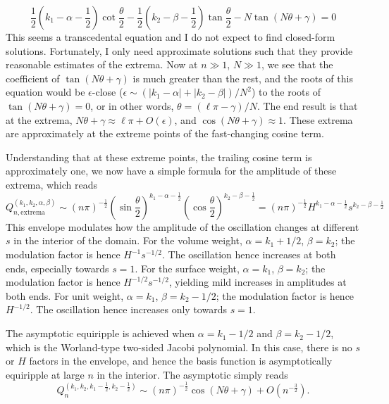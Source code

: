%
\[
    \frac{1}{2} \left(k_1 - \alpha - \frac{1}{2}\right) \cot\frac{\theta}{2} - \frac{1}{2} \left(k_2 - \beta - \frac{1}{2}\right) \tan \frac{\theta}{2} - N \tan \left(N\theta + \gamma\right) = 0
\]
%
This seems a transcedental equation and I do not expect to find closed-form solutions. Fortunately, I only need approximate solutions such that they provide reasonable estimates of the extrema.
Now at $n\gg 1$, $N \gg 1$, we see that the coefficient of $\tan(N\theta + \gamma)$ is much greater than the rest, and the roots of this equation would be $\epsilon$-close ($\epsilon \sim (|k_1 - \alpha| + |k_2 - \beta|)/N^2$) to the roots of $\tan(N\theta + \gamma) = 0$, or in other words, $\theta = (\ell \pi - \gamma)/N$.
The end result is that at the extrema, $N\theta + \gamma \approx \ell \pi + O(\epsilon)$, and $\cos(N\theta + \gamma) \approx 1$. These extrema are approximately at the extreme points of the fast-changing cosine term.

Understanding that at these extreme points, the trailing cosine term is approximately one, we now have a simple formula for the amplitude of these extrema, which reads
%
\begin{equation}
    Q_{n,\mathrm{extrema}}^{(k_1, k_2, \alpha, \beta)} \sim (n\pi)^{-\frac{1}{2}} (\sin \frac{\theta}{2})^{k_1 -\alpha - \frac{1}{2}} (\cos \frac{\theta}{2})^{k_2 -\beta - \frac{1}{2}} = (n\pi)^{-\frac{1}{2}} H^{k_1 -\alpha - \frac{1}{2}} s^{k_2 -\beta - \frac{1}{2}}
\end{equation}
%
This envelope modulates how the amplitude of the oscillation changes at different $s$ in the interior of the domain. For the volume weight, $\alpha = k_1 + 1/2$, $\beta = k_2$; the modulation factor is hence $H^{-1} s^{-1/2}$. The oscillation hence increases at both ends, especially towards $s=1$. For the surface weight, $\alpha = k_1$, $\beta = k_2$; the modulation factor is hence $H^{-1/2} s^{-1/2}$, yielding mild increases in amplitudes at both ends. For unit weight, $\alpha = k_1$, $\beta = k_2 - 1/2$; the modulation factor is hence $H^{-1/2}$. The oscillation hence increases only towards $s=1$.

The asymptotic equiripple is achieved when $\alpha = k_1 - 1/2$ and $\beta = k_2 - 1/2$, which is the Worland-type two-sided Jacobi polynomial. In this case, there is no $s$ or $H$ factors in the envelope, and hence the basis function is asymptotically equiripple at large $n$ in the interior. The asymptotic simply reads
%
\begin{equation}
    Q_n^{(k_1, k_2, k_1 - \frac{1}{2}, k_2 - \frac{1}{2})} \sim (n\pi)^{-\frac{1}{2}} \cos(N\theta + \gamma) + O\left(n^{-\frac{3}{2}}\right).
\end{equation}
%


